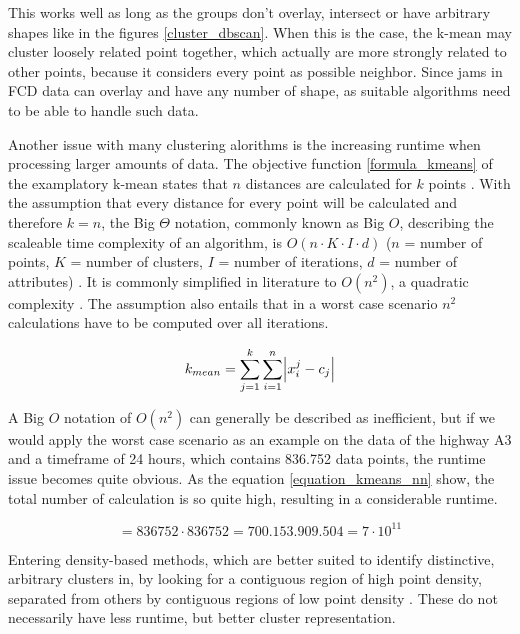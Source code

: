 \documentclass[a4paper,12pt]{report}
\begin{document}
This works well as long as the groups don't overlay, intersect or have arbitrary shapes like in the figures \ref{cluster_dbscan}. When this is the case, the k-mean may cluster loosely related point together, which actually are more strongly related to other points, because it considers every point as possible neighbor. Since jams in FCD data can overlay and have any number of shape, as suitable algorithms need to be able to handle such data.

Another issue with many clustering alorithms is the increasing runtime when processing larger amounts of data. The objective function \ref{formula_kmeans} of the examplatory k-mean states that $n$ distances are calculated for $k$ points \cite{Santhanam2010}. With the assumption that every distance for every point will be calculated and therefore $k=n$, the Big $\Theta$ notation, commonly known as Big $O$, describing the scaleable time complexity of an algorithm, is $O(n \cdot K \cdot I \cdot d)$ ($n$ = number of points, $K$ = number of clusters, $I$ = number of iterations, $d$ = number of attributes) \cite{Dalatu2016}. It is commonly simplified in literature to $O(n^2)$, a quadratic complexity \cite{Pakhira2014}. The assumption also entails that in a worst case scenario $n^2$ calculations have to be computed over all iterations.

\begin{equation}
\label{formula_kmeans}
	k_{mean} =  \sum_{j=1}^k{\sum_{i=1}^n{\abs{x_i^j-c_j}}}
\end{equation}

\bigskip

A Big $O$ notation of $O(n^2)$ can generally be described as inefficient, but if we would apply the worst case scenario as an example on the data of the highway A3 and a timeframe of 24 hours, which contains 836.752 data points, the runtime issue becomes quite obvious. As the equation \ref{equation_kmeans_nn} show, the total number of calculation is so quite high, resulting in a considerable runtime. \cite{Busch2004}

\begin{equation}
\label{equation_kmeans_nn}
	 = 836752 \cdot 836752 = 700.153.909.504 = 7 \cdot 10^{11}
\end{equation}

\bigskip

Entering density-based methods, which are better suited to identify distinctive, arbitrary clusters in, by looking for a contiguous region of high point density, separated from others by contiguous regions of low point density \cite{Chauhan2020}. These do not necessarily have less runtime, but better cluster representation.
\end{document}
